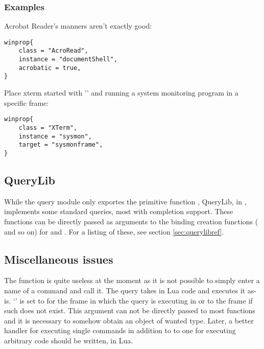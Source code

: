 \subsubsection{Examples}

Acrobat Reader's manners aren't exactly good:
\begin{verbatim}
winprop{
    class = "AcroRead",
    instance = "documentShell",
    acrobatic = true,
}
\end{verbatim}

Place xterm started with '' and running a system
monitoring program in a specific frame:
\begin{verbatim}
winprop{
    class = "XTerm",
    instance = "sysmon",
    target = "sysmonframe",
}
\end{verbatim}


\subsection{QueryLib}

While the query module only exportes the primitive function
, QueryLib, in , implements some
standard queries, most with completion support. These functions can be
directly passed as arguments to the binding creation functions
( and so on) for  and
. For a listing of these, see section
\ref{sec:querylibref}.

\subsection{Miscellaneous issues}

The  function is quite useless at the moment as it
is not possible to simply enter a name of a command and call it.
The query takes in Lua code and executes it as-is. `' is set
to  for the frame
in which the query is executing in or to the frame if such does not exist.
This argument can not be directly passed to most functions and it is
necessary to somehow obtain an object of wanted type. Later, a better
handler for executing single commands in addition to to one for executing
arbitrary code should be written, in Lua.

